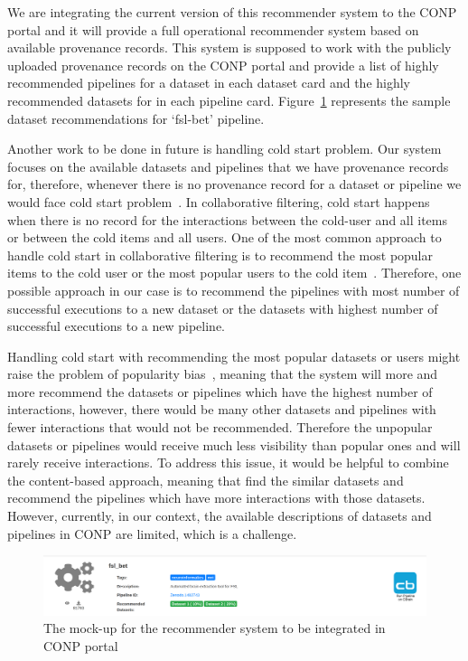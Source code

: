 We are integrating the current version of this recommender system to the CONP portal and it will provide a full operational recommender system based on available provenance records. This system is supposed to work with the publicly uploaded provenance records on the CONP portal and provide a list of highly recommended pipelines for a dataset in each dataset card and the highly recommended datasets for in each pipeline card. Figure~\ref{fig:mockup} represents the sample dataset recommendations for `fsl-bet' pipeline.


Another work to be done in future is handling cold start problem. Our system focuses on the available datasets and pipelines that we have provenance records for, therefore, whenever there is no provenance record for a dataset or pipeline we would face cold start problem~\cite{lika2014facing}. In collaborative filtering, cold start happens when there is no record for the interactions between the cold-user and all items or between the cold items and all users. One of the most common approach to handle cold start in collaborative filtering is to recommend the most popular items to the cold user or the most popular users to the cold item~\cite{ravichandranstate}. Therefore, one possible approach in our case is to recommend the pipelines with most number of successful executions to a new dataset or the datasets with highest number of successful executions to a new pipeline.

Handling cold start with recommending the most popular datasets or users might raise the problem of popularity bias~\cite{abdollahpouri2017controlling}, meaning that the system will more and more recommend the datasets or pipelines which have the highest number of interactions, however, there would be many other datasets and pipelines with fewer interactions that would not be recommended. Therefore the unpopular datasets or pipelines would receive much less visibility than popular ones and will rarely receive interactions. To address this issue, it would be helpful to combine the content-based approach, meaning that find the similar datasets and recommend the pipelines which have more interactions with those datasets. However, currently, in our context, the available descriptions of datasets and pipelines in CONP are limited, which is a challenge. 




\begin{figure}
    \centering
    \includegraphics[width=\textwidth]{figures/mockup.png}
    \caption{The mock-up for the recommender system to be integrated in CONP portal}
    \label{fig:mockup}
\end{figure}